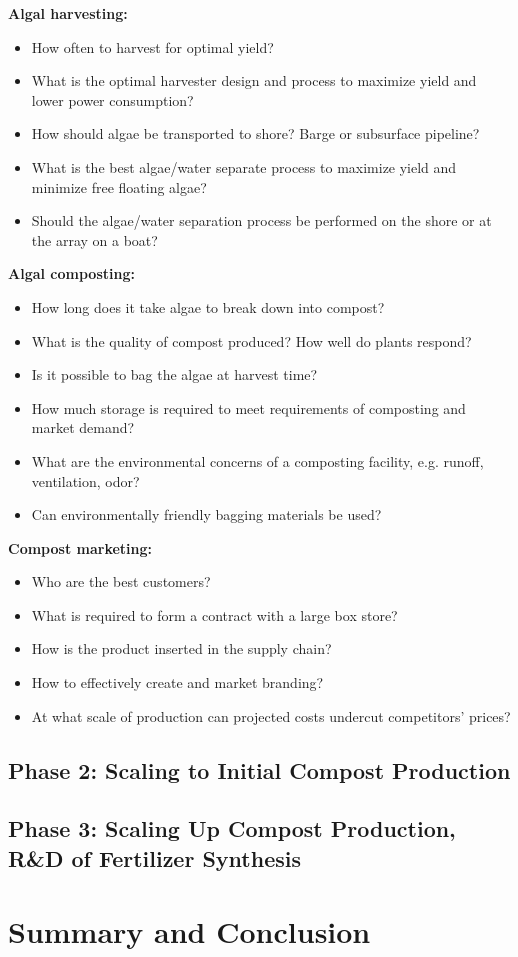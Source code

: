 \documentclass{article}
\begin{document}
\textbf{Algal harvesting:}
\begin{itemize}
  \item{How often to harvest for optimal yield?}
  \item{What is the optimal harvester design and process to maximize yield and lower power consumption?}
  \item{How should algae be transported to shore?  Barge or subsurface pipeline?}
  \item{What is the best algae/water separate process to maximize yield and minimize free floating algae?}
  \item{Should the algae/water separation process be performed on the shore or at the array on a boat?}
\end{itemize}

\textbf{Algal composting:}
\begin{itemize}
  \item{How long does it take algae to break down into compost?}
  \item{What is the quality of compost produced?  How well do plants respond?}
  \item{Is it possible to bag the algae at harvest time?}
  \item{How much storage is required to meet requirements of composting and market demand?}
  \item{What are the environmental concerns of a composting facility, e.g. runoff, ventilation, odor?}
  \item{Can environmentally friendly bagging materials be used?}
\end{itemize}

\textbf{Compost marketing:}
\begin{itemize}
  \item{Who are the best customers?}
  \item{What is required to form a contract with a large box store?}
  \item{How is the product inserted in the supply chain?}
  \item{How to effectively create and market branding?}
  \item{At what scale of production can projected costs undercut competitors' prices?}
\end{itemize}


\subsection{Phase 2: Scaling to Initial Compost Production}

\subsection{Phase 3: Scaling Up Compost Production, R\&D of Fertilizer Synthesis}

\section{Summary and Conclusion}
\end{document}
